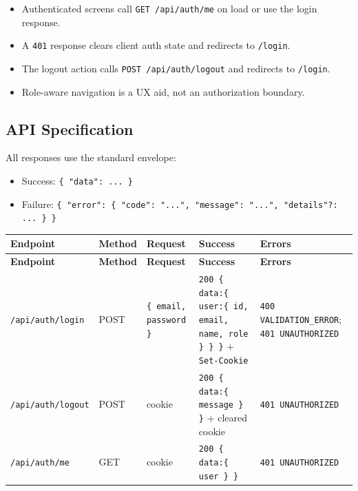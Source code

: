 \documentclass[11pt,a4paper]{article}
\begin{document}
\begin{itemize}[leftmargin=*,itemsep=2pt,topsep=2pt]
  \item Authenticated screens call \texttt{GET /api/auth/me} on load or use the login response.
  \item A \texttt{401} response clears client auth state and redirects to \texttt{/login}.
  \item The logout action calls \texttt{POST /api/auth/logout} and redirects to \texttt{/login}.
  \item Role-aware navigation is a UX aid, not an authorization boundary.
\end{itemize}

\subsection{API Specification}

All responses use the standard envelope:\\

\begin{itemize}[leftmargin=*,itemsep=2pt,topsep=2pt]
  \item Success: \texttt{\{ "data": ... \}}
  \item Failure: \texttt{\{ "error": \{ "code": "...", "message": "...", "details"?: ... \} \}}
\end{itemize}
\vspace{0.3em}
\begin{longtable}{|>{\RaggedRight}p{3.5cm}|>{\centering\arraybackslash}p{1.4cm}|>{\RaggedRight}p{2.2cm}|>{\RaggedRight}p{5.2cm}|>{\RaggedRight}p{3.5cm}|}
\hline
\rowcolor{zenPale}\textbf{Endpoint} & \textbf{Method} & \textbf{Request} & \textbf{Success} & \textbf{Errors} \\ \hline
\endfirsthead
\hline
\rowcolor{zenPale}\textbf{Endpoint} & \textbf{Method} & \textbf{Request} & \textbf{Success} & \textbf{Errors} \\ \hline
\endhead
\hline
\endfoot
\texttt{/\allowbreak api/\allowbreak auth/\allowbreak login} & POST & \texttt{\{ email, password \}} & \texttt{200 \{ data:\allowbreak  \{ user:\allowbreak  \{ id, email, name, role \} \} \}} + \texttt{Set-\allowbreak Cookie} & \texttt{400 VALIDATION\_\allowbreak ERROR}; \texttt{401 UNAUTHORIZED} \\ \hline
\texttt{/\allowbreak api/\allowbreak auth/\allowbreak logout} & POST & cookie & \texttt{200 \{ data:\allowbreak  \{ message \} \}} + cleared cookie & \texttt{401 UNAUTHORIZED} \\ \hline
\texttt{/\allowbreak api/\allowbreak auth/\allowbreak me} & GET & cookie & \texttt{200 \{ data:\allowbreak  \{ user \} \}} & \texttt{401 UNAUTHORIZED} \\ \hline
\end{longtable}
\vspace{0.3em}
\end{document}
